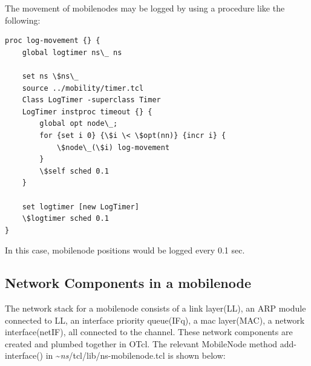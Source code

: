 The movement of mobilenodes may be logged by using a procedure like
the following:

\begin{verbatim}
proc log-movement {} {
    global logtimer ns\_ ns

    set ns \$ns\_
    source ../mobility/timer.tcl
    Class LogTimer -superclass Timer
    LogTimer instproc timeout {} {
        global opt node\_;
        for {set i 0} {\$i \< \$opt(nn)} {incr i} {
            \$node\_(\$i) log-movement
        }
        \$self sched 0.1
    }

    set logtimer [new LogTimer]
    \$logtimer sched 0.1
}
\end{verbatim} %
In this case, mobilenode positions would be logged every 0.1 sec.

\subsection{Network Components in a mobilenode}
\label{sec:mobilenode-components}

The network stack for a mobilenode consists of a link layer(LL), an
ARP module connected to LL, an interface priority queue(IFq), a mac
layer(MAC), a network interface(netIF), all connected to the channel. 
These network components are created and plumbed together in OTcl. 
The relevant MobileNode method add-interface() in
\textasciitilde\emph{ns}/{tcl/lib/ns-mobilenode.tcl} is shown below:

